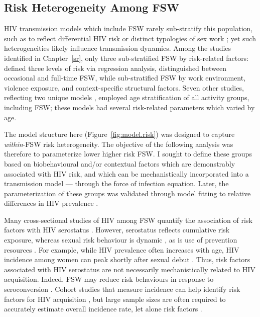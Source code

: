 \subsection{Risk Heterogeneity Among FSW}\label{model.par.fsw}
HIV transmission models which include FSW rarely sub-stratify this population, such as to reflect
differential HIV risk or distinct typologies of sex work \cite{Blanchard2008,Scorgie2012};
yet such heterogeneities likely influence transmission dynamics.
Among the studies identified in Chapter~\ref{sr},
only three sub-stratified FSW by risk-related factors:
\citet{Cremin2017} defined three levels of risk via regression analysis,
\citet{Low2015} distinguished between occasional and full-time FSW, while
\citet{Shannon2015} sub-stratified FSW by
work environment, violence exposure, and context-specific structural factors.
Seven other studies, reflecting two unique models \cite{Johnson2012,Maheu-Giroux2017},
employed age stratification of all activity groups, including FSW;
these models had several risk-related parameters which varied by age.
\par
The model structure here (Figure~\ref{fig:model.risk})
was designed to capture \emph{within}-FSW risk heterogeneity.
The objective of the following analysis was therefore to parameterize
lower \vs higher risk FSW.
I sought to define these groups based on biobehavioural and/or contextual factors
which are demonstrably associated with HIV risk,
and which can be mechanistically incorporated into a transmission model ---
\ie through the force of infection equation.
Later, the parameterization of these groups was validated through model fitting
to relative differences in HIV prevalence .
\par
Many cross-sectional studies of HIV among FSW quantify
the association of risk factors with HIV serostatus
\cite{Aklilu2001,Dunkle2005,Scorgie2012,Jonas2020}.
However, serostatus reflects cumulative risk exposure,
whereas sexual risk behaviour is dynamic \cite{Watts2010,vanWees2020},
as is use of prevention resources \cite{Roberts2020}.
For example, while HIV prevalence often increases with age,
HIV incidence among women can peak shortly after sexual debut \cite{Dellar2015}.
Thus, risk factors associated with HIV serostatus are not necessarily
mechanistically related to HIV acquisition.
Indeed, FSW may reduce risk behaviours in response to seroconversion \cite{McClelland2006}.
Cohort studies that measure incidence
can help identify risk factors for HIV acquisition \cite{McKinnon2015,Nouaman2022},
but large sample sizes are often required to accurately estimate overall incidence rate,
let alone risk factors \cite{Priddy2011}.
